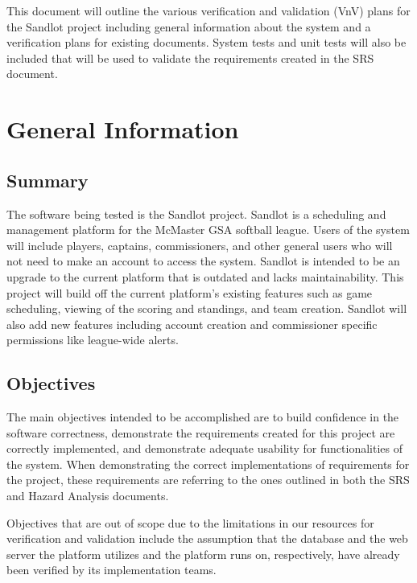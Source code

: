 \documentclass[12pt, titlepage]{article}
\begin{document}

This document will outline the various verification and validation (VnV) plans
for the Sandlot project including general information about the system and a
verification plans for existing documents. System tests and unit tests will
also be included that will be used to validate the requirements created in the
SRS document.

\section{General Information}

\subsection{Summary}

The software being tested is the Sandlot project. Sandlot is a scheduling and
management platform for the McMaster GSA softball league. Users of the system
will include players, captains, commissioners, and other general users who will
not need to make an account to access the system. Sandlot is intended to be an
upgrade to the current platform that is outdated and lacks maintainability. This
project will build off the current platform's existing features such as game
scheduling, viewing of the scoring and standings, and team creation. Sandlot will
also add new features including account creation and commissioner specific
permissions like league-wide alerts.

\subsection{Objectives}

The main objectives intended to be accomplished are to build confidence in the software
correctness, demonstrate the requirements created for this project are correctly
implemented, and demonstrate adequate usability for functionalities of the
system. When demonstrating the correct implementations of requirements for the
project, these requirements are referring to the ones outlined in both the
SRS and Hazard Analysis documents.

Objectives that are out of scope due to the limitations in our resources for
verification and validation include the assumption that the database and the web
server the platform utilizes and the platform runs on, respectively, have already
been verified by its implementation teams.
\end{document}
